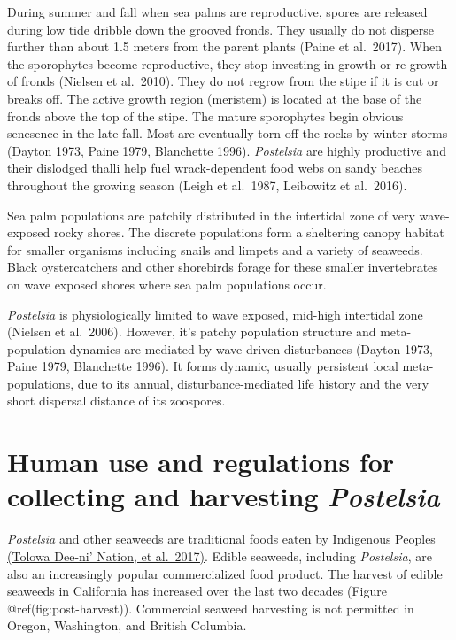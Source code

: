 \documentclass[
]{article}
\begin{document}
During summer and fall when sea palms are reproductive, spores are released during low tide dribble down the grooved fronds. They usually do not disperse further than about 1.5 meters from the parent plants (Paine et al.~2017). When the sporophytes become reproductive, they stop investing in growth or re-growth of fronds (Nielsen et al.~2010). They do not regrow from the stipe if it is cut or breaks off. The active growth region (meristem) is located at the base of the fronds above the top of the stipe. The mature sporophytes begin obvious senesence in the late fall. Most are eventually torn off the rocks by winter storms (Dayton 1973, Paine 1979, Blanchette 1996). \emph{Postelsia} are highly productive and their dislodged thalli help fuel wrack-dependent food webs on sandy beaches throughout the growing season (Leigh et al.~1987, Leibowitz et al.~2016).

Sea palm populations are patchily distributed in the intertidal zone of very wave-exposed rocky shores. The discrete populations form a sheltering canopy habitat for smaller organisms including snails and limpets and a variety of seaweeds. Black oystercatchers and other shorebirds forage for these smaller invertebrates on wave exposed shores where sea palm populations occur.

\emph{Postelsia} is physiologically limited to wave exposed, mid-high intertidal zone (Nielsen et al.~2006). However, it's patchy population structure and meta-population dynamics are mediated by wave-driven disturbances (Dayton 1973, Paine 1979, Blanchette 1996). It forms dynamic, usually persistent local meta-populations, due to its annual, disturbance-mediated life history and the very short dispersal distance of its zoospores.

\newpage

\hypertarget{human-use-and-regulations-for-collecting-and-harvesting-postelsia}{%
\section{\texorpdfstring{Human use and regulations for collecting and harvesting \emph{Postelsia}}{Human use and regulations for collecting and harvesting Postelsia}}\label{human-use-and-regulations-for-collecting-and-harvesting-postelsia}}

\emph{Postelsia} and other seaweeds are traditional foods eaten by Indigenous Peoples \href{https://caseagrant.ucsd.edu/sites/default/files/39-Rocha-Final.pdf}{(Tolowa Dee-ni' Nation, et al.~2017)}. Edible seaweeds, including \emph{Postelsia}, are also an increasingly popular commercialized food product. The harvest of edible seaweeds in California has increased over the last two decades (Figure @ref(fig:post-harvest)). Commercial seaweed harvesting is not permitted in Oregon, Washington, and British Columbia.
\end{document}
